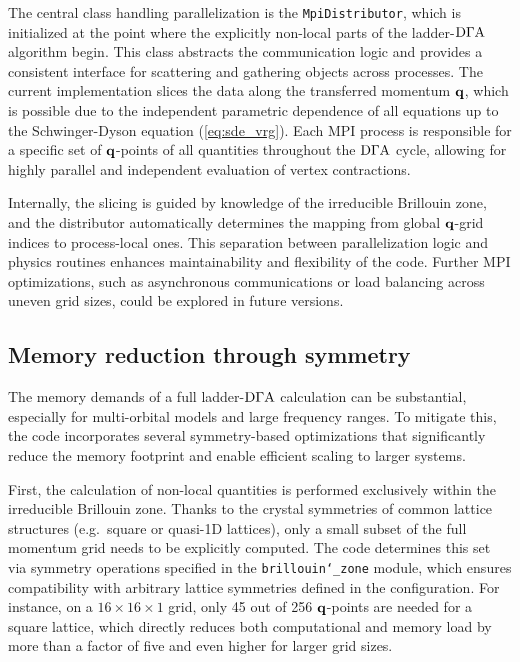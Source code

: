 \documentclass[../../main.tex]{subfiles}
\begin{document}
The central class handling parallelization is the \texttt{MpiDistributor}, which is initialized at the point where the explicitly non-local parts of the ladder-$\text{D}\Gamma\text{A}$ algorithm begin. This class abstracts the communication logic and provides a consistent interface for scattering and gathering objects across processes. The current implementation slices the data along the transferred momentum $\textbf{q}$, which is possible due to the independent parametric dependence of all equations up to the Schwinger-Dyson equation (\ref{eq:sde_vrg}). Each MPI process is responsible for a specific set of $\textbf{q}$-points of all quantities throughout the $\text{D}\Gamma\text{A}$ cycle, allowing for highly parallel and independent evaluation of vertex contractions.

Internally, the slicing is guided by knowledge of the irreducible Brillouin zone, and the distributor automatically determines the mapping from global $\textbf{q}$-grid indices to process-local ones. This separation between parallelization logic and physics routines enhances maintainability and flexibility of the code. Further MPI optimizations, such as asynchronous communications or load balancing across uneven grid sizes, could be explored in future versions.

\subsection{Memory reduction through symmetry}

The memory demands of a full ladder-$\text{D}\Gamma\text{A}$ calculation can be substantial, especially for multi-orbital models and large frequency ranges. To mitigate this, the code incorporates several symmetry-based optimizations that significantly reduce the memory footprint and enable efficient scaling to larger systems.

First, the calculation of non-local quantities is performed exclusively within the irreducible Brillouin zone. Thanks to the crystal symmetries of common lattice structures (e.g.\ square or quasi-1D lattices), only a small subset of the full momentum grid needs to be explicitly computed. The code determines this set via symmetry operations specified in the \texttt{brillouin\char`_zone} module, which ensures compatibility with arbitrary lattice symmetries defined in the configuration. For instance, on a $16\times16\times1$ grid, only 45 out of 256 $\textbf{q}$-points are needed for a square lattice, which directly reduces both computational and memory load by more than a factor of five and even higher for larger grid sizes.
\end{document}
